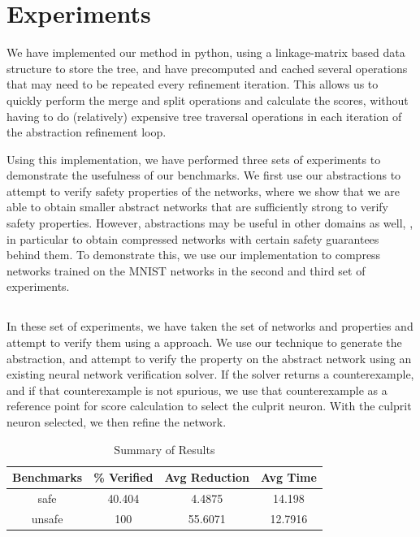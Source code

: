 \section{Experiments}

We have implemented our method in python, using a linkage-matrix based
data structure to store the tree, and have precomputed and cached several
operations that may need to be repeated every refinement iteration. This allows
us to quickly perform the merge and split operations and calculate the
scores,  without having to do (relatively)
expensive tree traversal operations in each iteration of the abstraction
refinement loop. 

Using this implementation, we have performed three sets of experiments to
demonstrate the usefulness of our benchmarks. We first use our abstractions to
attempt to verify safety properties of the \acasxu networks, where we
show that we are able to obtain smaller abstract networks that are sufficiently
strong to verify safety properties. However, abstractions may be useful in other
domains as well, , in particular to
obtain compressed networks with certain safety guarantees behind them. To
demonstrate this, we use our implementation to compress networks trained on the
MNIST networks in the second and third set of experiments. 


\subsection{\acasxu}

In these set of experiments, we have taken the \acasxu set of
networks  and
properties and attempt to verify them using a \cegar approach. We use our
technique to generate the abstraction, and attempt to verify the property on the
abstract network using an existing neural network verification solver. If the
solver returns a counterexample, and if that counterexample is not spurious, we
use that counterexample as a reference point for score calculation  to select the culprit neuron.  With the culprit
neuron selected, we then refine the network.

\begin{table}
\begin{tabular}{ |c|c|c|c| }
\hline
Benchmarks &    \% Verified &  Avg Reduction &  Avg Time \\
\hline
safe       &        40.404  &         4.4875 &   14.198  \\
unsafe     &       100      &        55.6071 &   12.7916 \\
\hline
\end{tabular}
\caption{Summary of \acasxu Results}
\label{t:acas-summary}
\end{table}

